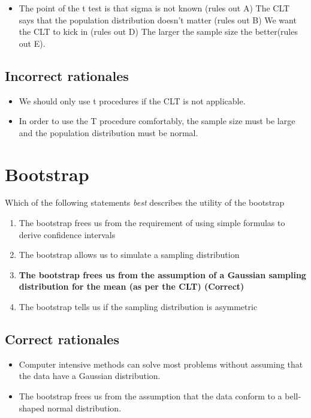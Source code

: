 \documentclass[letterpaper,9pt,twoside,printwatermark=false]{pinp}
\providecommand{\tightlist}{%
  \setlength{\itemsep}{0pt}\setlength{\parskip}{0pt}}
\begin{document}
\begin{itemize}
\tightlist
\item
  The point of the t test is that sigma is not known (rules out A) The
  CLT says that the population distribution doesn't matter (rules out B)
  We want the CLT to kick in (rules out D) The larger the sample size
  the better(rules out E).
\end{itemize}

\subsection{Incorrect rationales}\label{incorrect-rationales-5}

\begin{itemize}
\tightlist
\item
  We should only use t procedures if the CLT is not applicable.
\item
  In order to use the T procedure comfortably, the sample size must be
  large and the population distribution must be normal.
\end{itemize}

\section{Bootstrap}\label{bootstrap}

Which of the following statements \emph{best} describes the utility of
the bootstrap

\begin{enumerate}
\def\labelenumi{\alph{enumi}.}
\tightlist
\item
  The bootstrap frees us from the requirement of using simple formulas
  to derive confidence intervals
\item
  The bootstrap allows us to simulate a sampling distribution
\item
  \textbf{The bootstrap frees us from the assumption of a Gaussian
  sampling distribution for the mean (as per the CLT) (Correct)}
\item
  The bootstrap tells us if the sampling distribution is asymmetric
\end{enumerate}

\subsection{Correct rationales}\label{correct-rationales-6}

\begin{itemize}
\tightlist
\item
  Computer intensive methods can solve most problems without assuming
  that the data have a Gaussian distribution.
\item
  The bootstrap frees us from the assumption that the data conform to a
  bell-shaped normal distribution.
\end{itemize}
\end{document}
